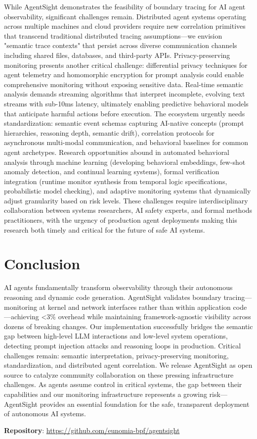\documentclass[sigplan,screen，review,9pt]{acmart}
\begin{document}
While AgentSight demonstrates the feasibility of boundary tracing for AI agent observability, significant challenges remain. Distributed agent systems operating across multiple machines and cloud providers require new correlation primitives that transcend traditional distributed tracing assumptions—we envision "semantic trace contexts" that persist across diverse communication channels including shared files, databases, and third-party APIs. Privacy-preserving monitoring presents another critical challenge: differential privacy techniques for agent telemetry and homomorphic encryption for prompt analysis could enable comprehensive monitoring without exposing sensitive data. Real-time semantic analysis demands streaming algorithms that interpret incomplete, evolving text streams with sub-10ms latency, ultimately enabling predictive behavioral models that anticipate harmful actions before execution. The ecosystem urgently needs standardization: semantic event schemas capturing AI-native concepts (prompt hierarchies, reasoning depth, semantic drift), correlation protocols for asynchronous multi-modal communication, and behavioral baselines for common agent archetypes. Research opportunities abound in automated behavioral analysis through machine learning (developing behavioral embeddings, few-shot anomaly detection, and continual learning systems), formal verification integration (runtime monitor synthesis from temporal logic specifications, probabilistic model checking), and adaptive monitoring systems that dynamically adjust granularity based on risk levels. These challenges require interdisciplinary collaboration between systems researchers, AI safety experts, and formal methods practitioners, with the urgency of production agent deployments making this research both timely and critical for the future of safe AI systems.


\section{Conclusion}

AI agents fundamentally transform observability through their autonomous reasoning and dynamic code generation. AgentSight validates boundary tracing—monitoring at kernel and network interfaces rather than within application code—achieving <3\% overhead while maintaining framework-agnostic visibility across dozens of breaking changes. Our implementation successfully bridges the semantic gap between high-level LLM interactions and low-level system operations, detecting prompt injection attacks and reasoning loops in production. Critical challenges remain: semantic interpretation, privacy-preserving monitoring, standardization, and distributed agent correlation. We release AgentSight as open source to catalyze community collaboration on these pressing infrastructure challenges. As agents assume control in critical systems, the gap between their capabilities and our monitoring infrastructure represents a growing risk—AgentSight provides an essential foundation for the safe, transparent deployment of autonomous AI systems.

\textbf{Repository}: \url{https://github.com/eunomia-bpf/agentsight}



\end{document}

